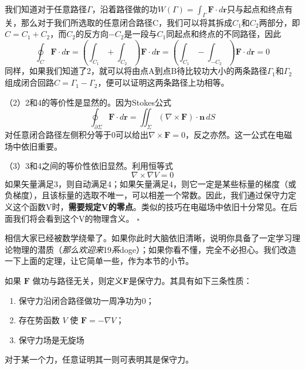 我们知道对于任意路径$\Gamma$，沿着路径做的功$ W(\Gamma) = \int_{\Gamma}  \mathbf{F}\cdot d\mathbf{r} $只与起点和终点有关，那么对于我们所选取的任意闭合路径C，我们可以将其拆成$C_1$和$C_2$两部分，即$C = C_1 +C_2$，而$C_2$的反方向$-C_2$是一段与$C_1$同起点和终点的不同路径，因此
\[
    \oint_C \mathbf{F}\cdot d\mathbf{r}=( \int_{C_1} + \int_{C_2} )\mathbf{F}\cdot d\mathbf{r} = ( \int_{C_1} - \int_{- C_2} )\mathbf{F}\cdot d\mathbf{r} = 0
\]
同样，如果我们知道了2，就可以将由点A到点B待比较功大小的两条路径$\Gamma_1$和$\Gamma_2$组成闭合回路$C = \Gamma_1 - \Gamma_2$，便可以证明这两条路径上功相等。

\noindent（2）2和4的等价性是显然的。因为Stokes公式
\[
    \oint_{\partial \Sigma} \mathbf{F} \cdot d\mathbf{r}
    = \iint_{\Sigma} (\nabla \times \mathbf{F}) \cdot \mathbf{n} \, dS
\]
对任意闭合路径左侧积分等于0可以给出$\nabla \times \mathbf{F} = 0$，反之亦然。这一公式在电磁场中依旧重要。

\noindent（3）3和4之间的等价性依旧显然。利用恒等式
\[
    \nabla \times \nabla V = 0
\]
如果矢量满足3，则自动满足4；如果矢量满足4，则它一定是某些标量的梯度（或负梯度），且该标量的选取不唯一，可以相差一个常数。因此，我们通过保守力定义这个函数V时，\textbf{需要规定V的零点}。类似的技巧在电磁场中依旧十分常见。在后面我们将会看到这个V的物理含义。
\hfill$\square$

相信大家已经被数学绕晕了。如果你此时大脑依旧清晰，说明你具备了一定学习理论物理的潜质（\textit{那么欢迎来}19\textit{系}doge）；如果你看不懂，完全不必担心。我们改造一下上面的定理，让它简单一些，作为本节的小节。
\begin{tcolorbox}[colback=white!5!white, colframe=red!75!black, title=保守力小结]
    如果 \(\mathbf{F}\) 做功与路径无关，则定义$\mathbf{F}$是保守力。其具有如下三条性质：
    \begin{enumerate}
        \item 保守力沿闭合路径做功一周净功为0；
        \item 存在势函数 \(V\) 使 \(\mathbf{F}=-\nabla V\)；
        \item 保守力场是无旋场
    \end{enumerate}
    对于某一个力，任意证明其一则可表明其是保守力。
\end{tcolorbox}

